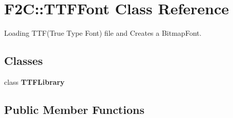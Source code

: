 \hypertarget{class_f2_c_1_1_t_t_f_font}{
\section{F2C::TTFFont Class Reference}
\label{class_f2_c_1_1_t_t_f_font}
}


Loading TTF(True Type Font) file and Creates a BitmapFont.  


\subsection*{Classes}
\begin{DoxyCompactItemize}
\item 
class {\bfseries TTFLibrary}
\end{DoxyCompactItemize}
\subsection*{Public Member Functions}

